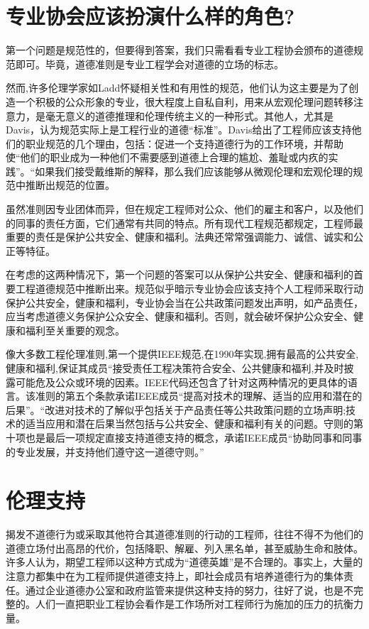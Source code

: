\documentclass[lang=cn,11pt,a4paper]{elegantpaper}
\begin{document}
\section{专业协会应该扮演什么样的角色?\cite{1,9}}
第一个问题是规范性的，但要得到答案，我们只需看看专业工程协会颁布的道德规范即可。毕竟，道德准则是专业工程学会对道德的立场的标志。

然而,许多伦理学家如Ladd\cite{3}怀疑相关性和有用性的规范，他们认为这主要是为了创造一个积极的公众形象的专业，很大程度上自私自利，用来从宏观伦理问题转移注意力，是毫无意义的道德推理和伦理传统主义的一种形式。其他人，尤其是Davis，认为规范实际上是工程行业的道德“标准”。Davis\cite{14}给出了工程师应该支持他们的职业规范的几个理由，包括：促进一个支持道德行为的工作环境，并帮助使“他们的职业成为一种他们不需要感到道德上合理的尴尬、羞耻或内疚的实践”。“如果我们接受戴维斯的解释，那么我们应该能够从微观伦理和宏观伦理的规范中推断出规范的位置。

虽然准则因专业团体而异，但在规定工程师对公众、他们的雇主和客户，以及他们的同事的责任方面，它们通常有共同的特点。所有现代工程规范都规定，工程师最重要的责任是保护公共安全、健康和福利。法典还常常强调能力、诚信、诚实和公正等特征。\cite{13}

在考虑的这两种情况下，第一个问题的答案可以从保护公共安全、健康和福利的首要工程道德规范中推断出来。规范似乎暗示专业协会应该支持个人工程师采取行动保护公共安全，健康和福利，专业协会当在公共政策问题发出声明，如产品责任，应当考虑道德义务保护公众安全、健康和福利。否则，就会破坏保护公众安全、健康和福利至关重要的观念。

像大多数工程伦理准则,第一个提供IEEE规范,在1990年实现,拥有最高的公共安全,健康和福利,保证其成员“接受责任工程决策符合安全、公共健康和福利,并及时披露可能危及公众或环境的因素。IEEE代码还包含了针对这两种情况的更具体的语言。该准则的第五个条款承诺IEEE成员“提高对技术的理解、适当的应用和潜在的后果”。“改进对技术的了解似乎包括关于产品责任等公共政策问题的立场声明;技术的适当应用和潜在后果当然包括与公共安全、健康和福利有关的问题。守则的第十项也是最后一项规定直接支持道德支持的概念，承诺IEEE成员“协助同事和同事的专业发展，并支持他们遵守这一道德守则。”

\section{伦理支持\cite{9}}
揭发不道德行为或采取其他符合其道德准则的行动的工程师，往往不得不为他们的道德立场付出高昂的代价，包括降职、解雇、列入黑名单，甚至威胁生命和肢体。许多人认为，期望工程师以这种方式成为“道德英雄”是不合理的\cite{15}。事实上，大量的注意力都集中在为工程师提供道德支持上，即社会成员有培养道德行为的集体责任。\cite{16}通过企业道德办公室和政府监管来提供这种支持的努力，往好了说，也是不完整的。人们一直把职业工程协会看作是工作场所对工程师行为施加的压力的抗衡力量。\cite{13}
\end{document}
